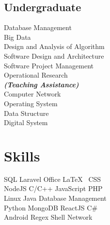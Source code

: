 \documentclass[letterpaper]{deedy-resume} %
\begin{document}
\begin{minipage}[t]{0.33\textwidth}
\subsection{Undergraduate}
Database Management \\
Big Data \\
Design and Analysis of Algorithm \\
Software Design and Architecture \\
Software Project Management \\
Operational Research \\
{\footnotesize \textit{\textbf{(Teaching Assistance) }}} \\
Computer Network \\
Operating System \\
Data Structure \\
Digital System
\sectionspace


\section{Skills}

SQL \textbullet{} Laravel \textbullet{} Office \textbullet{} \LaTeX\ \textbullet{} CSS \\
NodeJS \textbullet{} C/C++ \textbullet{} JavaScript \textbullet{} PHP \\
Linux \textbullet{} Java \textbullet{} Database Management \\
Python \textbullet{} MongoDB \textbullet{} ReactJS \textbullet{} C\# \\
Android \textbullet{} Regex \textbullet{} Shell \textbullet{} Network
\sectionspace


\end{minipage} %
\hfill
\end{document}
